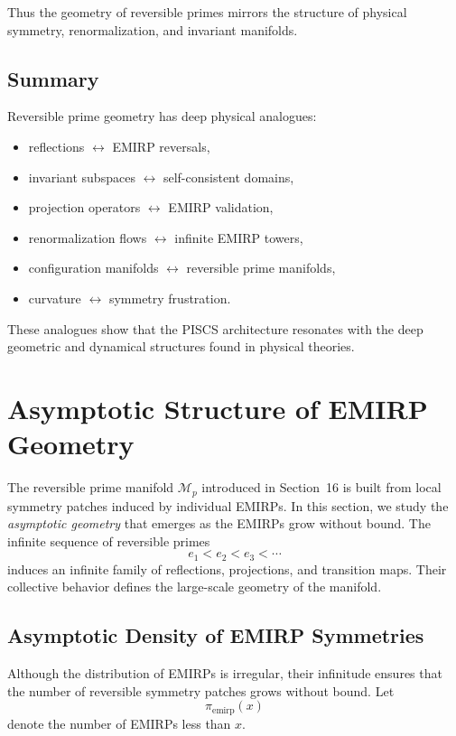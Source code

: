 \documentclass[11pt]{article}
\theoremstyle{definition}
\theoremstyle{plain}
\theoremstyle{remark}
\begin{document}
Thus the geometry of reversible primes mirrors the structure of physical
symmetry, renormalization, and invariant manifolds.

\subsection{Summary}

Reversible prime geometry has deep physical analogues:

\begin{itemize}
    \item reflections $\leftrightarrow$ EMIRP reversals,
    \item invariant subspaces $\leftrightarrow$ self-consistent domains,
    \item projection operators $\leftrightarrow$ EMIRP validation,
    \item renormalization flows $\leftrightarrow$ infinite EMIRP towers,
    \item configuration manifolds $\leftrightarrow$ reversible prime
    manifolds,
    \item curvature $\leftrightarrow$ symmetry frustration.
\end{itemize}

These analogues show that the PISCS architecture resonates with the
deep geometric and dynamical structures found in physical theories.

\section{Asymptotic Structure of EMIRP Geometry}

The reversible prime manifold $\mathcal{M}_p$ introduced in Section~16
is built from local symmetry patches induced by individual EMIRPs. In
this section, we study the \emph{asymptotic geometry} that emerges as
the EMIRPs grow without bound. The infinite sequence of reversible
primes
\[
e_1 < e_2 < e_3 < \cdots
\]
induces an infinite family of reflections, projections, and transition
maps. Their collective behavior defines the large-scale geometry of the
manifold.

\subsection{Asymptotic Density of EMIRP Symmetries}

Although the distribution of EMIRPs is irregular, their infinitude
ensures that the number of reversible symmetry patches grows without
bound. Let
\[
\pi_{\mathrm{emirp}}(x)
\]
denote the number of EMIRPs less than $x$.
\end{document}
